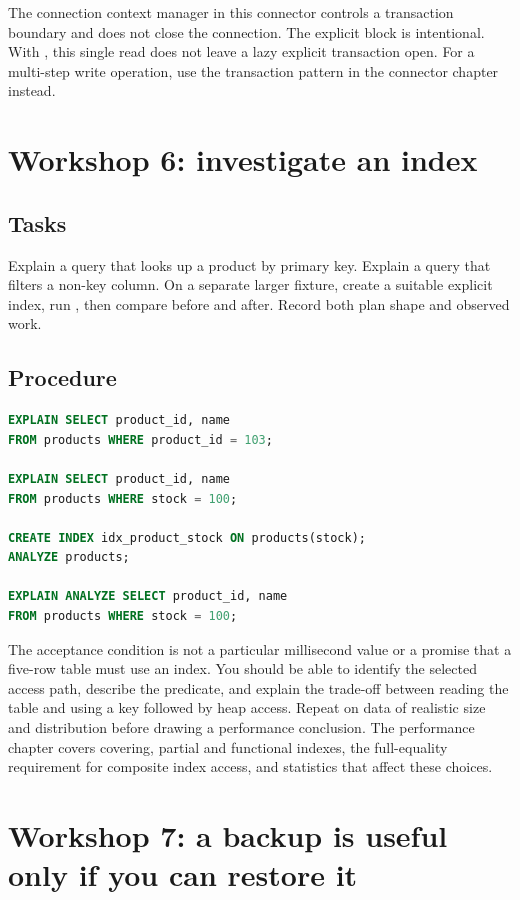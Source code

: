 The connection context manager in this connector controls a transaction
boundary and does not close the connection. The explicit 
block is intentional. With , this single read does not
leave a lazy explicit transaction open. For a multi-step write operation,
use the transaction pattern in the connector chapter instead.

\section{Workshop 6: investigate an index}
\subsection{Tasks}
Explain a query that looks up a product by primary key. Explain a query that
filters a non-key column. On a separate larger fixture, create a suitable
explicit index, run , then compare 
before and after. Record both plan shape and observed work.

\subsection{Procedure}
\begin{lstlisting}[language=SQL]
EXPLAIN SELECT product_id, name
FROM products WHERE product_id = 103;

EXPLAIN SELECT product_id, name
FROM products WHERE stock = 100;

CREATE INDEX idx_product_stock ON products(stock);
ANALYZE products;

EXPLAIN ANALYZE SELECT product_id, name
FROM products WHERE stock = 100;
\end{lstlisting}
The acceptance condition is not a particular millisecond value or a promise
that a five-row table must use an index. You should be able to identify the
selected access path, describe the predicate, and explain the trade-off
between reading the table and using a key followed by heap access. Repeat on
data of realistic size and distribution before drawing a performance
conclusion. The performance chapter covers covering, partial and functional
indexes, the full-equality requirement for composite index access, and
statistics that affect these choices.

\section{Workshop 7: a backup is useful only if you can restore it}

